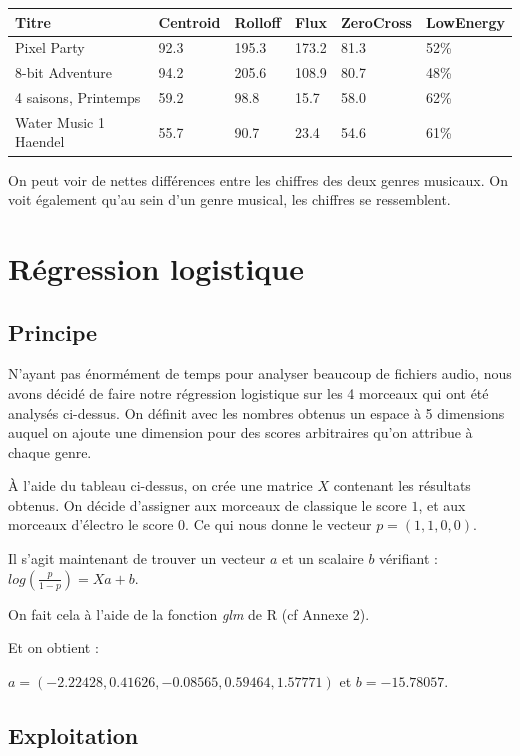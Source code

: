 \documentclass[a4paper]{article}
\begin{document}
\begin{center}
\begin{tabular}{|l|l|l|l|l|l|}
\hline
      Titre     & Centroid & Rolloff & Flux & ZeroCross & LowEnergy \\
      \hline
 Pixel Party   & 92.3  & 195.3 & 173.2 & 81.3 & 52\% \\
 8-bit Adventure  & 94.2 & 205.6 & 108.9 & 80.7 & 48\% \\ 
 \hline
 4 saisons, Printemps  & 59.2 & 98.8 & 15.7 & 58.0 & 62\% \\
 Water Music 1 Haendel  & 55.7 & 90.7 & 23.4 & 54.6 & 61\% \\
 \hline
\end{tabular}
\end{center}

On peut voir de nettes différences entre les chiffres des deux genres musicaux. On voit également qu'au sein d'un genre musical, les chiffres se ressemblent.


\section{Régression logistique}

\subsection{Principe}

N'ayant pas énormément de temps pour analyser beaucoup de fichiers audio, nous avons décidé de faire notre régression logistique sur les 4 morceaux qui ont été analysés ci-dessus. On définit avec les nombres obtenus un espace à 5 dimensions auquel on ajoute une dimension pour des scores arbitraires qu'on attribue à chaque genre.

À l'aide du tableau ci-dessus, on crée une matrice $X$ contenant les résultats obtenus. On décide d'assigner aux morceaux de classique le score $1$, et aux morceaux d'électro le score $0$. Ce qui nous donne le vecteur $p = (1,1,0,0)$.

Il s'agit maintenant de trouver un vecteur $a$ et un scalaire $b$ vérifiant : $log(\frac{p}{1-p}) = Xa +b$.

On fait cela à l'aide de la fonction \emph{glm} de R (cf Annexe 2).

Et on obtient : 

$a = (-2.22428 ,0.41626 ,-0.08565 ,0.59464 ,1.57771)$ et $b = -15.78057$.

\subsection{Exploitation}
\end{document}
